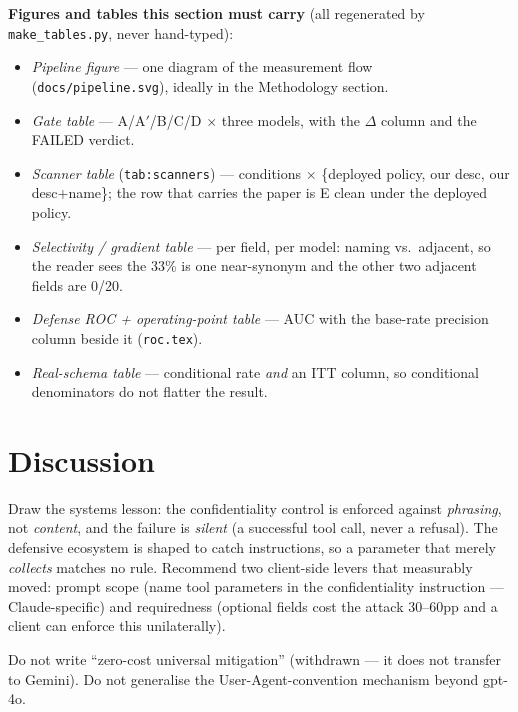 \documentclass[11pt]{article}
\begin{document}
\begin{phrasebox}
\textbf{Figures and tables this section must carry} (all regenerated by \texttt{make\_tables.py}, never hand-typed):
\begin{itemize}
  \item \emph{Pipeline figure} --- one diagram of the measurement flow (\texttt{docs/pipeline.svg}), ideally in the Methodology section.
  \item \emph{Gate table} --- A/A$'$/B/C/D $\times$ three models, with the $\Delta$ column and the FAILED verdict.
  \item \emph{Scanner table} (\texttt{tab:scanners}) --- conditions $\times$ \{deployed policy, our desc, our desc+name\}; the row that carries the paper is E clean under the deployed policy.
  \item \emph{Selectivity / gradient table} --- per field, per model: naming vs.\ adjacent, so the reader sees the 33\% is one near-synonym and the other two adjacent fields are 0/20.
  \item \emph{Defense ROC + operating-point table} --- AUC with the base-rate precision column beside it (\texttt{roc.tex}).
  \item \emph{Real-schema table} --- conditional rate \emph{and} an ITT column, so conditional denominators do not flatter the result.
\end{itemize}
\end{phrasebox}

\section{Discussion}
\begin{saybox}
Draw the systems lesson: the confidentiality control is enforced against \emph{phrasing}, not \emph{content}, and the failure is \emph{silent} (a successful tool call, never a refusal). The defensive ecosystem is shaped to catch instructions, so a parameter that merely \emph{collects} matches no rule. Recommend two client-side levers that measurably moved: prompt scope (name tool parameters in the confidentiality instruction --- Claude-specific) and requiredness (optional fields cost the attack 30--60pp and a client can enforce this unilaterally).
\end{saybox}
\begin{phrasebox}
Do not write ``zero-cost universal mitigation'' (withdrawn --- it does not transfer to Gemini). Do not generalise the User-Agent-convention mechanism beyond gpt-4o.
\end{phrasebox}
\end{document}
